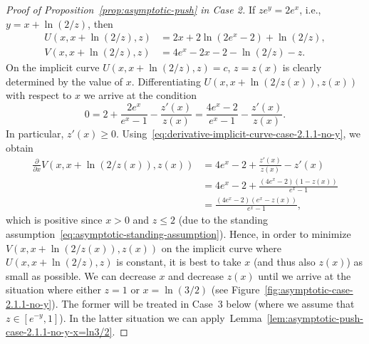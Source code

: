 \documentclass[a4paper]{amsart} %
\theoremstyle{definition}
\theoremstyle{remark}
\numberwithin{equation}{section}
\newcommand*{\XXXasymptoticDenominator}{V}
\newcommand*{\XXXasymptoticNominator}{U}
\begin{document}
\begin{proof}[Proof of Proposition~\ref{prop:asymptotic-push} in Case 2]
	If $ze^y = 2e^x$, i.e.,  $y = x + \ln(2/z)$, then
	\begin{align*}
	\XXXasymptoticNominator(x,x + \ln(2/z), z)   &= 2x + 2\ln(2e^x-2) + \ln(2/z),\\
	\XXXasymptoticDenominator(x,x+\ln(2/z), z) &= 4e^x - 2x - 2 - \ln(2/z)  - z.
	\end{align*}
	On the implicit curve $\XXXasymptoticNominator(x,x + \ln(2/z), z) = c $,
	$z = z(x)$ is clearly determined by the value of $x$.
	Differentiating  $\XXXasymptoticNominator(x,x + \ln(2/z(x)), z(x))$
	with respect to $x$ we arrive at the condition
	\begin{equation}
	\label{eq:derivative-implicit-curve-case-2.1.1-no-y}
	0 = 2 + \frac{2e^x}{e^x - 1} -\frac{z'(x)}{z(x)} 
	= \frac{4e^x - 2 }{e^x - 1} -\frac{z'(x)}{z(x)}.
	\end{equation}
	In particular, $z'(x) \geq 0$.
	Using~\eqref{eq:derivative-implicit-curve-case-2.1.1-no-y}, we obtain
	\begin{align*}
	\frac{\partial }{\partial x} \XXXasymptoticDenominator(x,x+\ln(2/z(x)), z(x)) 
	&= 4e^x - 2  + \frac{z'(x)}{z(x)} - z'(x)
	\\ %
	&=     4e^x - 2  + \frac{(4 e^x - 2)(1-z(x))}{e^x - 1}\\
	&= \frac{(4 e^x - 2)(e^x -z(x))}{e^x - 1}, 
	\end{align*}
	which is positive since $x >0$ and $z\leq 2$ (due to the standing assumption~\eqref{eq:asymptotic-standing-assumption}).
	Hence, in order to minimize $\XXXasymptoticDenominator(x,x+\ln(2/z(x)), z(x))$
	on the implicit curve where $\XXXasymptoticNominator(x,x + \ln(2/z), z)$ is constant,
	it is best to take $x$ (and thus also $z(x)$) as small as possible.
	We can decrease $x$ and decrease $z(x)$ until we arrive at the situation where either $z=1$ or $x=\ln(3/2)$ (see Figure~\ref{fig:asymptotic-case-2.1.1-no-y}).
	The former will be treated in Case~3 below (where we assume that $z\in [e^{-y}, 1]$). 	
	In the latter situation we can apply~Lemma~\ref{lem:asymptotic-push-case-2.1.1-no-y-x=ln3/2}.
	

\end{proof}
\end{document}
